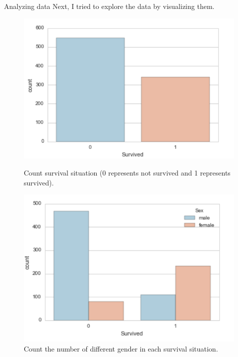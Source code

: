 \documentclass[a4paper,12pt]{article}
\begin{document}
\begin{section}{Analyzing data}
Next, I tried to explore the data by visualizing them.\\


\begin{figure}
\centering
\begin{minipage}{.5\textwidth}
  \includegraphics[width=\textwidth]{survive_Ratio.png}
  \caption{Count survival situation (0 represents not survived and 1 represents survived).}
\end{minipage}%
\hfill
\begin{minipage}{.5\textwidth}
  \includegraphics[width=\textwidth]{gender_survive.png}
  \caption{Count the number of different gender in each survival situation.}
\end{minipage}
\end{figure}




\end{section}
\end{document}
